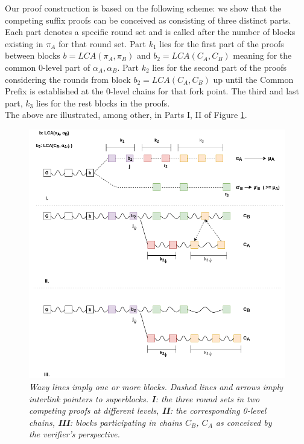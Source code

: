 \documentclass[11pt,a4paper]{article}
\begin{document}
Our proof construction is based on the following scheme: we show that the competing suffix proofs can be conceived as consisting of three distinct parts. Each part denotes a specific round set and is called after the number of blocks existing in $\pi_A$ for that round set. Part $k_1$ lies for the first part of the proofs between blocks $b = LCA(\pi_A, \pi_B)$ and $b_2 = LCA(C_A, C_B)$ meaning for the common 0-level part of $\alpha_A,  \alpha_B$. Part $k_2$ lies for the second part of the proofs considering the rounds from block $b_2 = LCA(C_A, C_B)$ up until the Common Prefix is established at the 0-level chains for that fork point. The third and last part, $k_3$ lies for the rest blocks in the proofs.\\
The above are illustrated, among other, in Parts I, II of Figure \ref{fig:proof_velvet}.

\begin{figure}[h!]
	\begin{center}
		\includegraphics[scale=0.5]{figures/proof_velvet.png}
	\end{center}
	\caption{\textit{ Wavy lines imply one or more blocks. Dashed lines and arrows imply interlink pointers to superblocks. \textbf{I}: the three round sets in two competing proofs at different levels, \textbf{II}: the corresponding 0-level chains, \textbf{III}: blocks participating in chains $C_B$, $C_A$ as conceived by the verifier's perspective.}}
	\label{fig:proof_velvet}
\end{figure}
\end{document}
